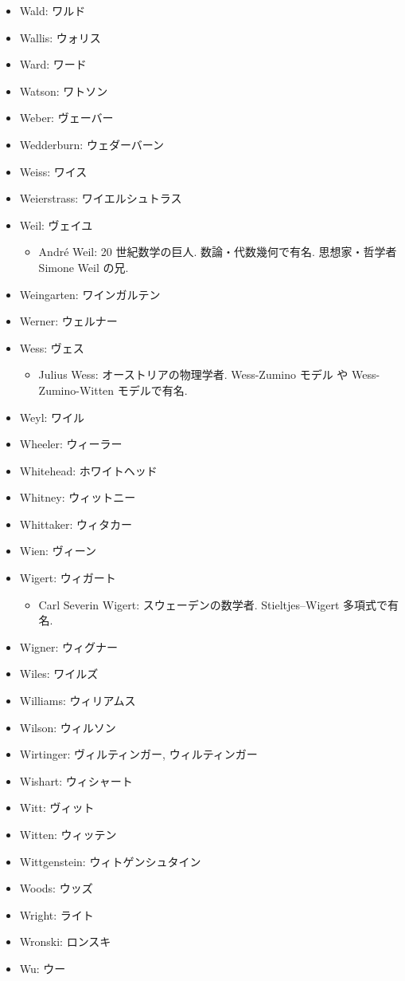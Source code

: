 \documentclass[openany, a4paper, oneside]{jsbook}
\begin{document}
\begin{itemize}
\item Wald: ワルド
\item Wallis: ウォリス
\item Ward: ワード
\item Watson: ワトソン
\item Weber: ヴェーバー
\item Wedderburn: ウェダーバーン
\item Weiss: ワイス
\item Weierstrass: ワイエルシュトラス
\item Weil: ヴェイユ
\begin{itemize}
\item Andr\'e Weil: 20 世紀数学の巨人. 数論・代数幾何で有名. 思想家・哲学者 Simone Weil の兄.
\end{itemize}
\item Weingarten: ワインガルテン
\item Werner: ウェルナー
\item Wess: ヴェス
\begin{itemize}
\item Julius Wess: オーストリアの物理学者. Wess-Zumino モデル や Wess-Zumino-Witten モデルで有名.
\end{itemize}
\item Weyl: ワイル
\item Wheeler: ウィーラー
\item Whitehead: ホワイトヘッド
\item Whitney: ウィットニー
\item Whittaker: ウィタカー
\item Wien: ヴィーン
\item Wigert: ウィガート
\begin{itemize}
\item Carl Severin Wigert: スウェーデンの数学者. Stieltjes–Wigert 多項式で有名.
\end{itemize}
\item Wigner: ウィグナー
\item Wiles: ワイルズ
\item Williams: ウィリアムス
\item Wilson: ウィルソン
\item Wirtinger: ヴィルティンガー, ウィルティンガー
\item Wishart: ウィシャート
\item Witt: ヴィット
\item Witten: ウィッテン
\item Wittgenstein: ウィトゲンシュタイン
\item Woods: ウッズ
\item Wright: ライト
\item Wronski: ロンスキ
\item Wu: ウー
\end{itemize}
\end{document}

